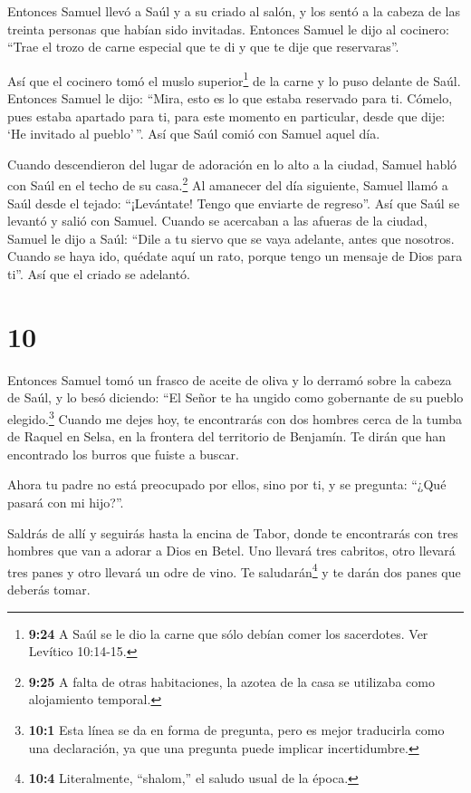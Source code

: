  Entonces Samuel llevó a Saúl y a su criado al salón, y los
sentó a la cabeza de las treinta personas que habían sido invitadas.
 Entonces Samuel le dijo al cocinero: ``Trae el trozo de
carne especial que te di y que te dije que reservaras''.

 Así que el cocinero tomó el muslo superior\footnote{\textbf{9:24}
  A Saúl se le dio la carne que sólo debían comer los sacerdotes. Ver
  Levítico 10:14-15.} de la carne y lo puso delante de Saúl. Entonces
Samuel le dijo: ``Mira, esto es lo que estaba reservado para ti. Cómelo,
pues estaba apartado para ti, para este momento en particular, desde que
dije: `He invitado al pueblo'\,''. Así que Saúl comió con Samuel aquel
día.

 Cuando descendieron del lugar de adoración en lo alto a la
ciudad, Samuel habló con Saúl en el techo de su casa.\footnote{\textbf{9:25}
  A falta de otras habitaciones, la azotea de la casa se utilizaba como
  alojamiento temporal.}  Al amanecer del día siguiente,
Samuel llamó a Saúl desde el tejado: ``¡Levántate! Tengo que enviarte de
regreso''. Así que Saúl se levantó y salió con Samuel. 
Cuando se acercaban a las afueras de la ciudad, Samuel le dijo a Saúl:
``Dile a tu siervo que se vaya adelante, antes que nosotros. Cuando se
haya ido, quédate aquí un rato, porque tengo un mensaje de Dios para
ti''. Así que el criado se adelantó.

\hypertarget{section-9}{%
\section{10}\label{section-9}}

 Entonces Samuel tomó un frasco de aceite de oliva y lo
derramó sobre la cabeza de Saúl, y lo besó diciendo: ``El Señor te ha
ungido como gobernante de su pueblo elegido.\footnote{\textbf{10:1} Esta
  línea se da en forma de pregunta, pero es mejor traducirla como una
  declaración, ya que una pregunta puede implicar incertidumbre.}
 Cuando me dejes hoy, te encontrarás con dos hombres cerca
de la tumba de Raquel en Selsa, en la frontera del territorio de
Benjamín. Te dirán que han encontrado los burros que fuiste a buscar.

Ahora tu padre no está preocupado por ellos, sino por ti, y se pregunta:
``¿Qué pasará con mi hijo?''.

 Saldrás de allí y seguirás hasta la encina de Tabor, donde
te encontrarás con tres hombres que van a adorar a Dios en Betel. Uno
llevará tres cabritos, otro llevará tres panes y otro llevará un odre de
vino.  Te saludarán\footnote{\textbf{10:4} Literalmente,
  ``shalom,'' el saludo usual de la época.} y te darán dos panes que
deberás tomar.

